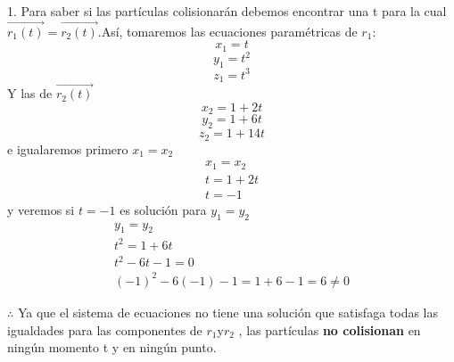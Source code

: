 \documentclass[12pt]{article}
\begin{document}
1. Para saber si las partículas colisionarán debemos encontrar una t para la cual $\vec{r_1(t)} = \vec{r_2(t)}$.Así, tomaremos las ecuaciones paramétricas de $r_1$:
\[ x_1 = t\]
\[ y_1 = t^2\]
\[ z_1 = t^3\]
Y las de $\vec{r_2(t)}$
\[ x_2 = 1+2t\]
\[ y_2 = 1+6t\]
\[ z_2 = 1+14t\]
e igualaremos primero $x_1 = x_2$
 \begin{align*}
   x_1 = x_2 \\
   t = 1+2t \\
   t=-1
 \end{align*}
 y veremos si $t=-1$ es solución para $y_1 = y_2$
 \begin{align*}
   y_1 = y_2 \\
   t^2 =  1+6t \\
   t^2 -6t -1 = 0 \\
   (-1)^2 - 6 (-1) -1 = 1 +6 -1 = 6 \neq 0
 \end{align*}

$ \therefore $ Ya que el sistema de ecuaciones no tiene una solución que satisfaga todas las igualdades para las componentes de $r_1 $y$ r_2$ , las partículas \textbf{no colisionan} en ningún momento t y en ningún punto.\\
\end{document}
